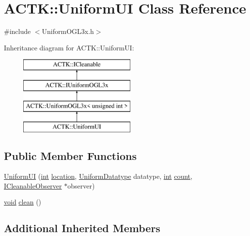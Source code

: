 \hypertarget{class_a_c_t_k_1_1_uniform_u_i}{\section{A\-C\-T\-K\-:\-:Uniform\-U\-I Class Reference}
\label{class_a_c_t_k_1_1_uniform_u_i}
}


{\ttfamily \#include $<$Uniform\-O\-G\-L3x.\-h$>$}

Inheritance diagram for A\-C\-T\-K\-:\-:Uniform\-U\-I\-:\begin{figure}[H]
\begin{center}
\leavevmode
\includegraphics[height=4.000000cm]{class_a_c_t_k_1_1_uniform_u_i}
\end{center}
\end{figure}
\subsection*{Public Member Functions}
\begin{DoxyCompactItemize}
\item 
\hyperlink{class_a_c_t_k_1_1_uniform_u_i_a73f868a0f26a8b5c06eae14d3d79fdaf}{Uniform\-U\-I} (\hyperlink{wglew_8h_a500a82aecba06f4550f6849b8099ca21}{int} \hyperlink{glew_8h_a050778a7129cc14e57da7024beb87ce8}{location}, \hyperlink{namespace_a_c_t_k_a0206df759d1628359ad73c2acea69d0e}{Uniform\-Datatype} datatype, \hyperlink{wglew_8h_a500a82aecba06f4550f6849b8099ca21}{int} \hyperlink{glew_8h_a10b284d589000663becfbc6867a3a9f7}{count}, \hyperlink{class_a_c_t_k_1_1_i_cleanable_observer}{I\-Cleanable\-Observer} $\ast$observer)
\item 
\hyperlink{wglew_8h_aeea6e3dfae3acf232096f57d2d57f084}{void} \hyperlink{class_a_c_t_k_1_1_uniform_u_i_a3d1294847d1d3fb7873267202b4aa4df}{clean} ()
\end{DoxyCompactItemize}
\subsection*{Additional Inherited Members}


